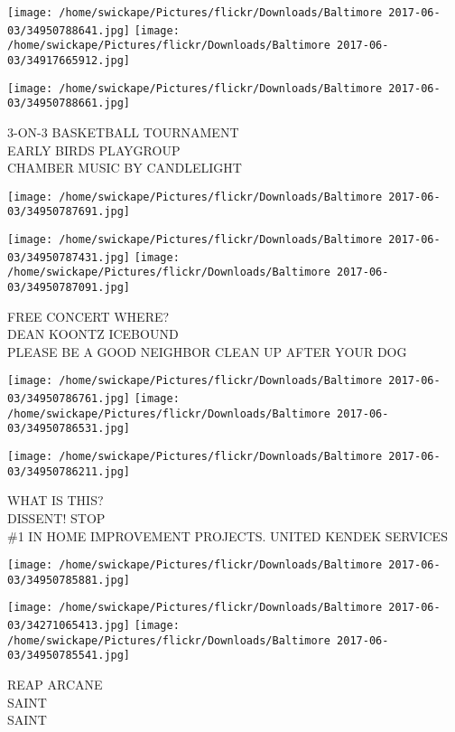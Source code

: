 \documentclass[10pt,letterpaper]{article}
\begin{document}
\texttt{[image: /home/swickape/Pictures/flickr/Downloads/Baltimore 2017-06-03/34950788641.jpg]}
\texttt{[image: /home/swickape/Pictures/flickr/Downloads/Baltimore 2017-06-03/34917665912.jpg]}

\texttt{[image: /home/swickape/Pictures/flickr/Downloads/Baltimore 2017-06-03/34950788661.jpg]}

3{-}ON{-}3 BASKETBALL TOURNAMENT\\
EARLY BIRDS PLAYGROUP\\
CHAMBER MUSIC BY CANDLELIGHT
\pagebreak

\texttt{[image: /home/swickape/Pictures/flickr/Downloads/Baltimore 2017-06-03/34950787691.jpg]}

\vspace{0.25in}
\texttt{[image: /home/swickape/Pictures/flickr/Downloads/Baltimore 2017-06-03/34950787431.jpg]}
\texttt{[image: /home/swickape/Pictures/flickr/Downloads/Baltimore 2017-06-03/34950787091.jpg]}

FREE CONCERT WHERE?\\
DEAN KOONTZ ICEBOUND\\
PLEASE BE A GOOD NEIGHBOR CLEAN UP AFTER YOUR DOG
\pagebreak

\texttt{[image: /home/swickape/Pictures/flickr/Downloads/Baltimore 2017-06-03/34950786761.jpg]}
\texttt{[image: /home/swickape/Pictures/flickr/Downloads/Baltimore 2017-06-03/34950786531.jpg]}

\texttt{[image: /home/swickape/Pictures/flickr/Downloads/Baltimore 2017-06-03/34950786211.jpg]}

WHAT IS THIS?\\
DISSENT! STOP\\
\#1 IN HOME IMPROVEMENT PROJECTS.  UNITED KENDEK SERVICES
\pagebreak

\texttt{[image: /home/swickape/Pictures/flickr/Downloads/Baltimore 2017-06-03/34950785881.jpg]}

\vspace{0.25in}
\texttt{[image: /home/swickape/Pictures/flickr/Downloads/Baltimore 2017-06-03/34271065413.jpg]}
\texttt{[image: /home/swickape/Pictures/flickr/Downloads/Baltimore 2017-06-03/34950785541.jpg]}

REAP ARCANE\\
SAINT\\
SAINT
\pagebreak
\end{document}
